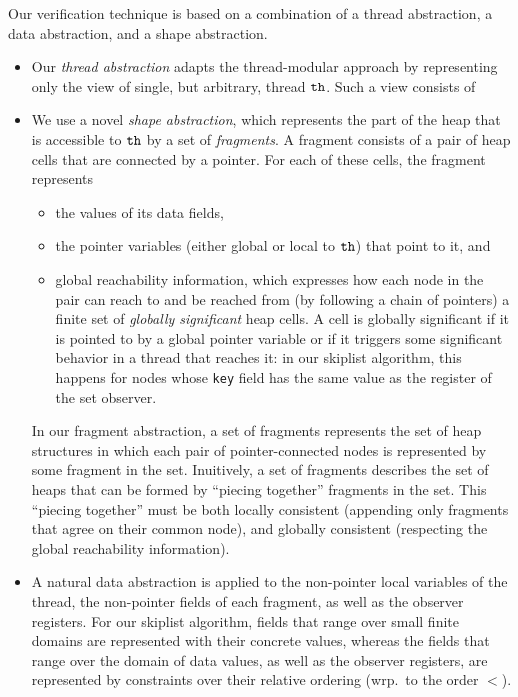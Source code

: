 Our verification technique is based on a combination of a thread abstraction, a
data  abstraction, and a shape abstraction.
\begin{itemize}
  \item
Our {\em thread abstraction} adapts the thread-modular approach by representing only the view of single, but arbitrary, thread ${\tt th}$. Such a view consists of
\item
We use a novel {\em shape abstraction}, which represents the part of the heap
that is accessible to ${\tt th}$ by a set of {\em fragments}. 
A fragment consists of a pair of heap cells that are connected by a pointer.
For each of these cells, the fragment represents
\begin{itemize}
\item the values of its data fields,
\item the pointer variables (either global or local to ${\tt th}$)
  that point  to it, and
\item global reachability information, which expresses how
  each node in the pair can reach to and be reached from
  (by following a chain of pointers) a finite set of {\em globally significant}
  heap cells. A cell is globally significant if it is pointed to by a
  global pointer variable or if it triggers some significant behavior in
  a thread that reaches it: in our
  skiplist algorithm, this happens for nodes whose
  {\tt key} field has the  same value as the register of the set observer.
\end{itemize}
In our fragment abstraction, a set of fragments represents the set of heap
structures in which each pair of pointer-connected nodes is represented by some
fragment in the set.
Inuitively, a set of fragments describes the set of heaps that can be formed by
``piecing together'' fragments in the set. This ``piecing together'' must
be both locally consistent (appending only fragments that agree on their
common node), and globally consistent (respecting the global reachability
information).
\item
A natural data abstraction is applied to the non-pointer local
variables of the thread, the non-pointer fields of each fragment, as well as
the observer registers. For our
skiplist algorithm, fields that range over small finite domains are represented
with their concrete values, whereas the fields that range over the domain of
data values, as well as the observer registers,
are represented by constraints over their relative ordering
(wrp.\ to the order $<$).
\end{itemize}
